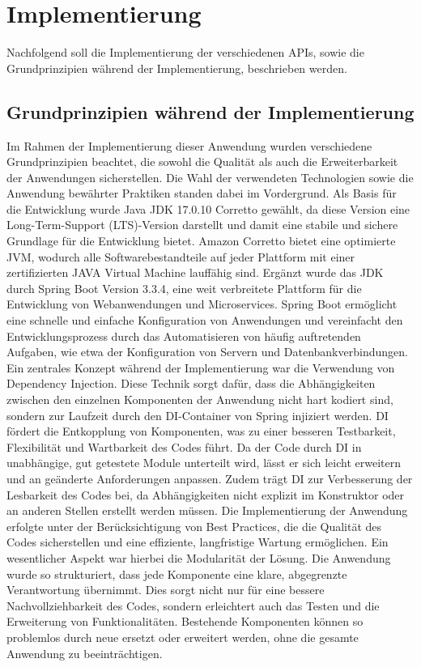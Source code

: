 \chapter{Implementierung} %
\label{sec:implementierung}
Nachfolgend soll die Implementierung der verschiedenen APIs, sowie die Grundprinzipien während der Implementierung, beschrieben werden.
\section{Grundprinzipien während der Implementierung} %
\label{sec:prinzipien}
Im Rahmen der Implementierung dieser Anwendung wurden verschiedene Grundprinzipien beachtet, die sowohl die Qualität als auch die Erweiterbarkeit der Anwendungen  sicherstellen. Die Wahl der verwendeten Technologien sowie die Anwendung bewährter Praktiken standen dabei im Vordergrund. Als Basis für die Entwicklung wurde Java JDK 17.0.10 Corretto gewählt, da diese Version eine Long-Term-Support (LTS)-Version darstellt und damit eine stabile und sichere Grundlage für die Entwicklung bietet. Amazon Corretto bietet eine optimierte JVM, wodurch alle Softwarebestandteile auf jeder Plattform mit einer zertifizierten JAVA Virtual Machine lauffähig sind. Ergänzt wurde das JDK durch Spring Boot Version 3.3.4, eine weit verbreitete Plattform für die Entwicklung von Webanwendungen und Microservices. Spring Boot ermöglicht eine schnelle und einfache Konfiguration von Anwendungen und vereinfacht den Entwicklungsprozess durch das Automatisieren von häufig auftretenden Aufgaben, wie etwa der Konfiguration von Servern und Datenbankverbindungen.
\noindent
Ein zentrales Konzept während der Implementierung war die Verwendung von Dependency Injection. Diese Technik sorgt dafür, dass die Abhängigkeiten zwischen den einzelnen Komponenten der Anwendung nicht hart kodiert sind, sondern zur Laufzeit durch den DI-Container von Spring injiziert werden. DI fördert die Entkopplung von Komponenten, was zu einer besseren Testbarkeit, Flexibilität und Wartbarkeit des Codes führt. Da der Code durch DI in unabhängige, gut getestete Module unterteilt wird, lässt er sich leicht erweitern und an geänderte Anforderungen anpassen. Zudem trägt DI zur Verbesserung der Lesbarkeit des Codes bei, da Abhängigkeiten nicht explizit im Konstruktor oder an anderen Stellen erstellt werden müssen.
\noindent
Die Implementierung der Anwendung erfolgte unter der Berücksichtigung von Best Practices, die die Qualität des Codes sicherstellen und eine effiziente, langfristige Wartung ermöglichen. Ein wesentlicher Aspekt war hierbei die Modularität der Lösung. Die Anwendung wurde so strukturiert, dass jede Komponente eine klare, abgegrenzte Verantwortung übernimmt. Dies sorgt nicht nur für eine bessere Nachvollziehbarkeit des Codes, sondern erleichtert auch das Testen und die Erweiterung von Funktionalitäten. Bestehende Komponenten können so problemlos durch neue ersetzt oder erweitert werden, ohne die gesamte Anwendung zu beeinträchtigen.




